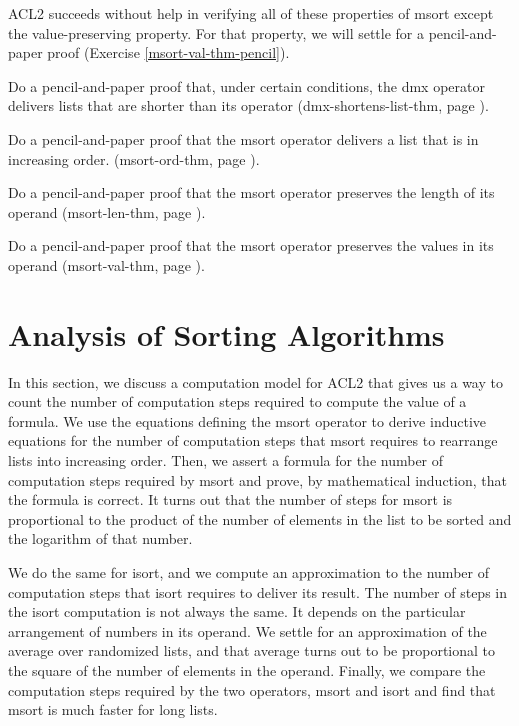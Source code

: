 ACL2 succeeds without help in verifying all of these properties of msort
except the value-preserving property. For that property,
we will settle for a pencil-and-paper proof (Exercise \ref{msort-val-thm-pencil}).

\begin{ExerciseList}
\Exercise
Do a pencil-and-paper proof that, under certain conditions, the dmx operator
delivers lists that are shorter than its operator
(dmx-shortens-list-thm, page \pageref{defthm:dmx-shortens-list}).

\Exercise
Do a pencil-and-paper proof that the msort operator
delivers a list that is in increasing order.
(msort-ord-thm, page \pageref{defthm:msort-ord}).

\Exercise
Do a pencil-and-paper proof that the msort operator
preserves the length of its operand
(msort-len-thm, page \pageref{defthm:msort-len}).

\Exercise
\label{msort-val-thm-pencil}
Do a pencil-and-paper proof that the msort operator
preserves the values in its operand
(msort-val-thm, page \pageref{defthm:msort-val}).
\end{ExerciseList}

\section{Analysis of Sorting Algorithms}
\label{sec:sort-analysis}

In this section, we discuss a computation model for ACL2
that gives us a way to count the number of computation steps required
to compute the value of a formula. We use the equations defining
the msort operator to derive inductive equations
for the number of computation steps that msort requires to rearrange lists
into increasing order.
Then, we assert a formula for the number of computation steps required
by msort and prove, by mathematical induction,
that the formula is correct.
It turns out that the number of steps for msort
is proportional to the product of
the number of elements in the list to be sorted
and the logarithm of that number.

We do the same for isort, and
we compute an approximation to the number of computation steps
that isort requires to deliver its result.
The number of steps in the isort computation is not always the same.
It depends on the particular arrangement
of numbers in its operand.
We settle for an approximation of the average over randomized lists,
and that average turns out to be proportional
to the square of the number of elements in the operand.
Finally, we compare the computation steps required by
the two operators, msort and isort and find that
msort is much faster for long lists.


